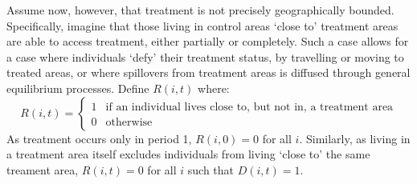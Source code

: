 \documentclass{article}
\begin{document}
\begin{spacing}{1.1}
Assume now, however, that treatment is not precisely geographically bounded.  
Specifically, imagine that those living in control areas `close to' treatment 
areas are able to access treatment, either partially or completely.  Such a 
case allows for a case where individuals `defy' their treatment status, by 
travelling or moving to treated areas, or where spillovers from treatment 
areas is diffused through general equilibrium processes.  Define $R(i,t)$ 
where:
\begin{equation}
\nonumber
 R(i,t) =
  \begin{cases}
   1   & \text{if an individual lives close to, but not in, a treatment area} \\
   0   & \text{otherwise} 
  \end{cases}
\end{equation}
As treatment occurs only in period 1, $R(i,0)=0$ for all $i$.  Similarly, as 
living in a treatment area itself excludes individuals from living `close to' 
the same treament area, $R(i,t)=0$ for all $i$ such that $D(i,t)=1$.


\end{spacing}
\end{document}
